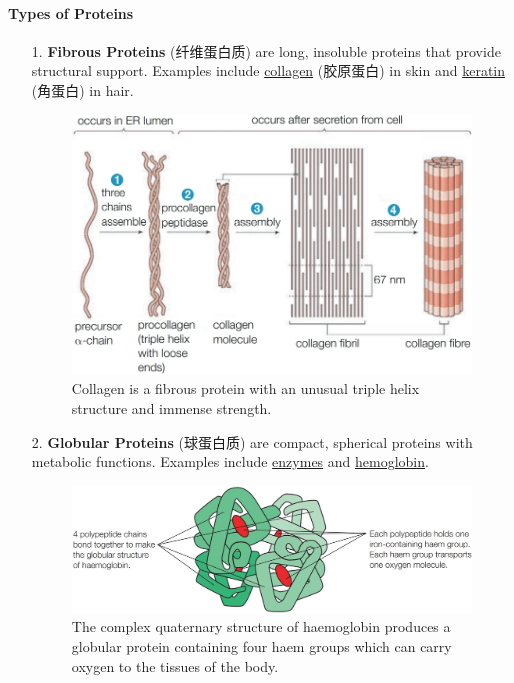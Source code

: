 \paragraph{Types of Proteins}
\begin{itemize}
    \item[1.] \textbf{Fibrous Proteins} (纤维蛋白质) are long, insoluble proteins that provide structural support. Examples include
    \underline{collagen} (胶原蛋白) in skin and \underline{keratin} (角蛋白) in hair.
    \begin{figure}[H]
        \centering
        \includegraphics[scale=0.3]{Biology/1A/Images/1A-5-5.png}
        \caption{Collagen is a fibrous protein with an unusual triple helix structure and immense strength.}
    \end{figure}
    \item[2.] \textbf{Globular Proteins} (球蛋白质) are compact, spherical proteins with metabolic functions. Examples include
    \underline{enzymes} and \underline{hemoglobin}.
    \begin{figure}[H]
        \centering
        \includegraphics[scale=0.3]{Biology/1A/Images/1A-5-6.png}
        \caption{The complex quaternary structure of haemoglobin produces a globular protein containing four haem groups which
        can carry oxygen to the tissues of the body.}
    \end{figure}
\end{itemize}

